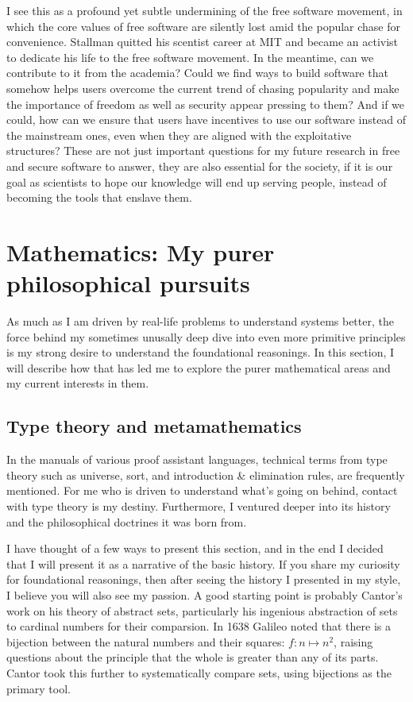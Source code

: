 \documentclass[10pt]{article}
\begin{document}
I see this as a profound yet subtle undermining of the free software movement,
in which the core values of free software are silently lost amid the popular
chase for convenience. Stallman quitted his scentist career at MIT and became
an activist to dedicate his life to the free software movement. In the
meantime, can we contribute to it from the academia? Could we find ways to
build software that somehow helps users overcome the current trend of chasing
popularity and make the importance of freedom as well as security appear
pressing to them? And if we could, how can we ensure that users have incentives
to use our software instead of the mainstream ones, even when they are aligned
with the exploitative structures? These are not just important questions for
my future research in free and secure software to answer, they are also
essential for the society, if it is our goal as scientists to hope our
knowledge will end up serving people, instead of becoming the tools that
enslave them.

\section[Mathematics]{Mathematics: My purer philosophical pursuits}
\label{sec.math}
As much as I am driven by real-life problems to understand systems better, the
force behind my sometimes unusally deep dive into even more primitive
principles is my strong desire to understand the foundational reasonings. In
this section, I will describe how that has led me to explore the purer
mathematical areas and my current interests in them.

\subsection{Type theory and metamathematics}
In the manuals of various proof assistant languages, technical terms from type
theory such as universe, sort, and introduction \& elimination rules, are
frequently mentioned. For me who is driven to understand what's going on
behind, contact with type theory is my destiny. Furthermore, I ventured deeper
into its history and the philosophical doctrines it was born from.

I have thought of a few ways to present this section, and in the end I decided
that I will present it as a narrative of the basic history. If you share my
curiosity for foundational reasonings, then after seeing the history I
presented in my style, I believe you will also see my passion.  A good starting
point is probably Cantor's work on his theory of abstract sets, particularly
his ingenious abstraction of sets to cardinal numbers for their comparsion.  In
1638 Galileo noted that there is a bijection between the natural numbers and
their squares: $f : n \mapsto n^2$, raising questions about the principle that
the whole is greater than any of its parts. Cantor took this further to
systematically compare sets, using bijections as the primary tool. 
\end{document}
